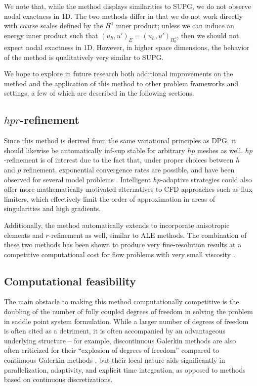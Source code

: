 \documentclass[final,leqno]{siamltex}
\newcommand{\LRp}[1]{\left( #1 \right)}
\begin{document}
We note that, while the method displays similarities to SUPG, we do not observe nodal exactness in 1D.  The two methods differ in that we do not work directly with coarse scales defined by the $H^1$ inner product; unless we can induce an energy inner product such that $\LRp{u_h,u'}_E = \LRp{u_h,u'}_{H^1_0}$, then we should not expect nodal exactness in 1D.  However, in higher space dimensions, the behavior of the method is qualitatively very similar to SUPG.  

We hope to explore in future research both additional improvements on the method and the application of this method to other problem frameworks and settings, a few of which are described in the following sections.  

\subsection{$hpr$-refinement}

Since this method is derived from the same variational principles as DPG, it should likewise be automatically inf-sup stable for arbitrary $hp$ meshes as well.  $hp$-refinement is of interest due to the fact that, under proper choices between $h$ and $p$ refinement, exponential convergence rates are possible, and have been observed for several model problems \cite{demkowicz2006computing}.  Intelligent $hp$-adaptive strategies could also offer more mathematically motivated alternatives to CFD approaches such as flux limiters, which effectively limit the order of approximation in areas of singularities and high gradients.  

Additionally, the method automatically extends to incorporate anisotropic elements and $r$-refinement as well, similar to ALE methods.  The combination of these two methods has been shown to produce very fine-resolution results at a competitive computational cost for flow problems with very small viscosity \cite{AlmeidaAnisotropy}.  

\subsection{Computational feasibility}

The main obstacle to making this method computationally competitive is the doubling of the number of fully coupled degrees of freedom in solving the problem in saddle point system formulation.  While a larger number of degrees of freedom is often cited as a detriment, it is often accompanied by an advantageous underlying structure -- for example, discontinuous Galerkin methods are also often criticized for their ``explosion of degrees of freedom'' compared to continuous Galerkin methods \cite{cottrell2007isogeometric}, but their local nature aids significantly in parallelization, adaptivity, and explicit time integration, as opposed to methods based on continuous discretizations.  
\end{document}
